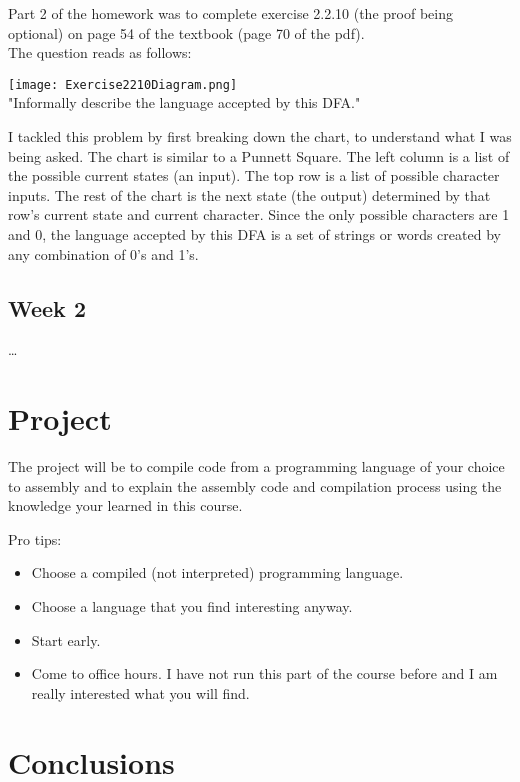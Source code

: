 \documentclass{article}
\theoremstyle{theorem}
\theoremstyle{definition}
\theoremstyle{remark}
\begin{document}
Part 2 of the homework was to complete exercise 2.2.10 (the proof being optional) on page 54 of the textbook (page 70 of the pdf).\\
The question reads as follows:
\begin{center}
    \texttt{[image: Exercise2210Diagram.png]}\\
"Informally describe the language accepted by this DFA."
\end{center}
I tackled this problem by first breaking down the chart, to understand what I was being asked. The chart is similar to a Punnett Square. The left column is a list of the possible current states (an input). The top row is a list of possible character inputs. The rest of the chart is the next state (the output) determined by that row's current state and current character. Since the only possible characters are 1 and 0, the language accepted by this DFA is a set of strings or words created by any combination of 0's and 1's. 


\subsection{Week 2}

\ldots

\section{Project}

The project will be to compile code from a programming language of your choice to assembly and to explain the assembly code and compilation process using the knowledge your learned in this course. 


\medskip\noindent
Pro tips:
\begin{itemize}
\item Choose a compiled (not interpreted) programming language.
\item Choose a language that you find interesting anyway.
\item Start early.
\item Come to office hours. I have not run this part of the course before and I am really interested what you will find.
\end{itemize}
 
\section{Conclusions}\label{conclusions}
\end{document}
